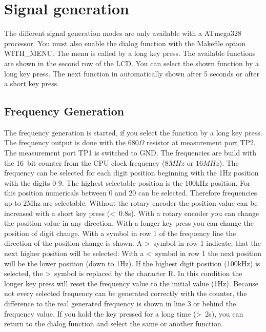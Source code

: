 \chapter{Signal generation}

The different signal generation modes are only available with a ATmega328 processor.
You must also enable the dialog function with the Makefile option WITH\_MENU.
The menu is called by a long key press. The available functions are shown in the
second row of the LCD. You can select the shown function by a long key press.
The next function in automatically shown after 5 seconds or after a short key press.

\label{sec:generation}
\section{Frequency Generation}
The frequency generation is started, if you select the  function by
a long key press.
The frequency output is done with the \(680\Omega\) resistor at measurement port TP2.
The measurement port TP1 is switched to GND.
The frequencies are build with the 16~bit counter from the CPU clock frequency 
(\(8MHz\) or \(16MHz\)).
The frequency can be selected for each digit position beginning with the 1Hz position with the digits 0-9.
The highest selectable position is the 100kHz position. For this position numericals between 0 and 20 can be selected.
Therefore frequencies up to 2Mhz are selectable.
Without the rotary encoder the position value can be increased with a short key press (\textless~0.8s).
With a rotary encoder you can change the position value in any direction.
With a longer key press you can change the position of digit change.
With a symbol in row 1 of the frequency line the direction of the position change is shown. 
A \textgreater~symbol in row 1 indicate, that the next higher position will be selected.
With a \textless~symbol in row 1 the next position will be the lower position (down to 1Hz).
If the highest digit position (100kHz) is selected, the \textgreater~symbol is replaced by the character R.
In this condition the longer key press will reset the frequency value to the initial value (1Hz).
Because not every selected frequency can be generated correctly with the counter,
the difference to the real generated frequency is shown in line 3 or behind the frequency value.
If you hold the key pressed for a long time (\textgreater~2s), you can return to the dialog function and select
the same or another function.

